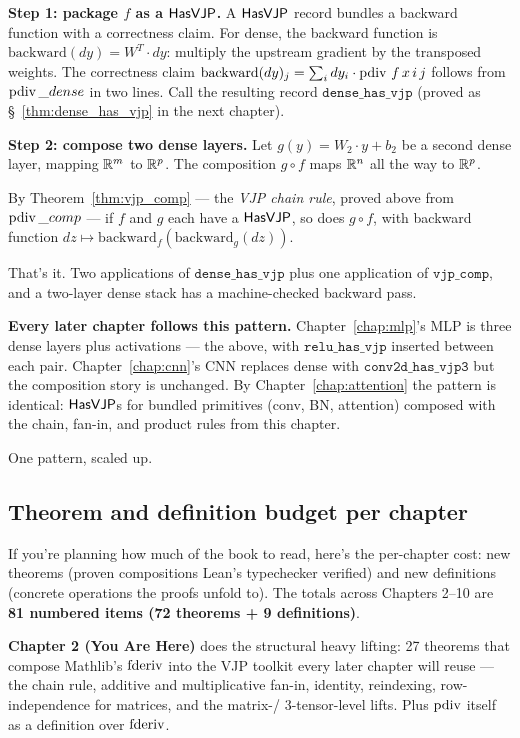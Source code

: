 \textbf{Step 1: package $f$ as a $\mathsf{HasVJP}$.} A $\mathsf{HasVJP}$ record
bundles a backward function with a correctness claim. For dense, the
backward function is
$\mathrm{backward}(dy) = W^T \cdot dy$: multiply the upstream
gradient by the transposed weights. The correctness claim
$\mathrm{backward}(dy)_j = \sum_i dy_i \cdot \operatorname{pdiv}\, f\, x\, i\, j$
follows from $\operatorname{pdiv}\_dense$ in two lines. Call the resulting record
$\texttt{dense\_has\_vjp}$ (proved as
\S~\ref{thm:dense_has_vjp} in the next chapter).

\textbf{Step 2: compose two dense layers.} Let
$g(y) = W_2 \cdot y + b_2$ be a second dense layer, mapping
$\mathbb{R}^{m}$ to $\mathbb{R}^{p}$. The composition $g \circ f$ maps
$\mathbb{R}^{n}$ all the way to $\mathbb{R}^{p}$.

By Theorem~\ref{thm:vjp_comp} --- the \emph{VJP chain rule}, proved
above from $\operatorname{pdiv}\_comp$ --- if $f$ and $g$ each have a $\mathsf{HasVJP}$, so
does $g \circ f$, with backward function
$dz \mapsto \mathrm{backward}_f(\mathrm{backward}_g(dz))$.

That's it. Two applications of $\texttt{dense\_has\_vjp}$ plus one
application of $\texttt{vjp\_comp}$, and a two-layer dense stack has
a machine-checked backward pass.

\textbf{Every later chapter follows this pattern.}
Chapter~\ref{chap:mlp}'s MLP is three dense layers plus activations
--- the above, with $\texttt{relu\_has\_vjp}$ inserted between each
pair. Chapter~\ref{chap:cnn}'s CNN replaces dense with
$\texttt{conv2d\_has\_vjp3}$ but the composition story is unchanged.
By Chapter~\ref{chap:attention} the pattern is identical:
$\mathsf{HasVJP}$s for bundled primitives (conv, BN, attention) composed
with the chain, fan-in, and product rules from this chapter.

One pattern, scaled up.

\subsection*{Theorem and definition budget per chapter}

If you're planning how much of the book to read, here's the
per-chapter cost: new theorems (proven compositions Lean's
typechecker verified) and new definitions (concrete operations
the proofs unfold to). The totals across Chapters 2--10 are
\textbf{81 numbered items (72 theorems + 9 definitions)}.

\textbf{Chapter 2 (You Are Here)} does the structural heavy lifting:
27 theorems that compose Mathlib's \(\operatorname{fderiv}\) into the VJP
toolkit every later chapter will reuse --- the chain rule,
additive and multiplicative fan-in, identity, reindexing,
row-independence for matrices, and the matrix-/ 3-tensor-level
lifts. Plus \(\operatorname{pdiv}\) itself as a definition over \(\operatorname{fderiv}\).

